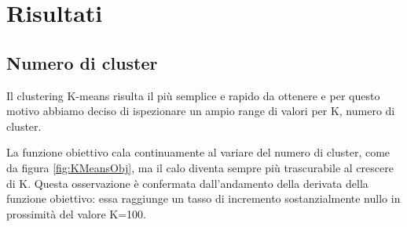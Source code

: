\documentclass[
	12pt, %
	a4paper, %
	oneside, %
	headinclude,footinclude, %
	BCOR5mm, %
]{scrartcl}
\begin{document}
\section{Risultati}

	\subsection{Numero di cluster}
		Il clustering K-means risulta il più semplice e rapido da ottenere e per questo motivo abbiamo deciso di ispezionare un ampio range di valori per K, numero di cluster.

		La funzione obiettivo cala continuamente al variare del numero di cluster, come da figura \ref{fig:KMeansObj}, ma il calo diventa sempre più trascurabile al crescere di K.
		Questa osservazione è confermata dall'andamento della derivata della funzione obiettivo: essa raggiunge un tasso di incremento sostanzialmente nullo in prossimità del valore K=100.
\end{document}
